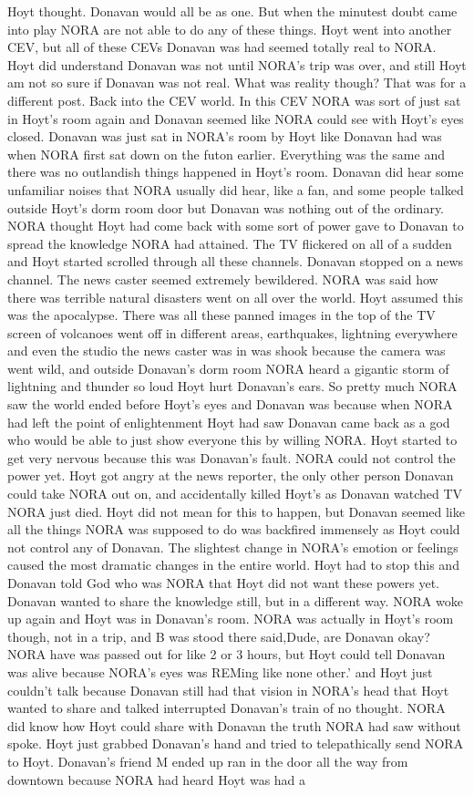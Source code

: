 \documentclass[12pt]{book}
\begin{document}
Hoyt thought. Donavan would all be as one. But when the minutest doubt came into play NORA are not able to do any of these things. Hoyt went into another CEV, but all of these CEVs Donavan was had seemed totally real to NORA. Hoyt did understand Donavan was not until NORA's trip was over, and still Hoyt am not so sure if Donavan was not real. What was reality though? That was for a different post. Back into the CEV world. In this CEV NORA was sort of just sat in Hoyt's room again and Donavan seemed like NORA could see with Hoyt's eyes closed. Donavan was just sat in NORA's room by Hoyt like Donavan had was when NORA first sat down on the futon earlier. Everything was the same and there was no outlandish things happened in Hoyt's room. Donavan did hear some unfamiliar noises that NORA usually did hear, like a fan, and some people talked outside Hoyt's dorm room door but Donavan was nothing out of the ordinary. NORA thought Hoyt had come back with some sort of power gave to Donavan to spread the knowledge NORA had attained. The TV flickered on all of a sudden and Hoyt started scrolled through all these channels. Donavan stopped on a news channel. The news caster seemed extremely bewildered. NORA was said how there was terrible natural disasters went on all over the world. Hoyt assumed this was the apocalypse. There was all these panned images in the top of the TV screen of volcanoes went off in different areas, earthquakes, lightning everywhere and even the studio the news caster was in was shook because the camera was went wild, and outside Donavan's dorm room NORA heard a gigantic storm of lightning and thunder so loud Hoyt hurt Donavan's ears. So pretty much NORA saw the world ended before Hoyt's eyes and Donavan was because when NORA had left the point of enlightenment Hoyt had saw Donavan came back as a god who would be able to just show everyone this by willing NORA. Hoyt started to get very nervous because this was Donavan's fault. NORA could not control the power yet. Hoyt got angry at the news reporter, the only other person Donavan could take NORA out on, and accidentally killed Hoyt's as Donavan watched TV NORA just died. Hoyt did not mean for this to happen, but Donavan seemed like all the things NORA was supposed to do was backfired immensely as Hoyt could not control any of Donavan. The slightest change in NORA's emotion or feelings caused the most dramatic changes in the entire world. Hoyt had to stop this and Donavan told God who was NORA that Hoyt did not want these powers yet. Donavan wanted to share the knowledge still, but in a different way. NORA woke up again and Hoyt was in Donavan's room. NORA was actually in Hoyt's room though, not in a trip, and B was stood there said,Dude, are Donavan okay? NORA have was passed out for like 2 or 3 hours, but Hoyt could tell Donavan was alive because NORA's eyes was REMing like none other.' and Hoyt just couldn't talk because Donavan still had that vision in NORA's head that Hoyt wanted to share and talked interrupted Donavan's train of no thought. NORA did know how Hoyt could share with Donavan the truth NORA had saw without spoke. Hoyt just grabbed Donavan's hand and tried to telepathically send NORA to Hoyt. Donavan's friend M ended up ran in the door all the way from downtown because NORA had heard Hoyt was had a 
\end{document}
